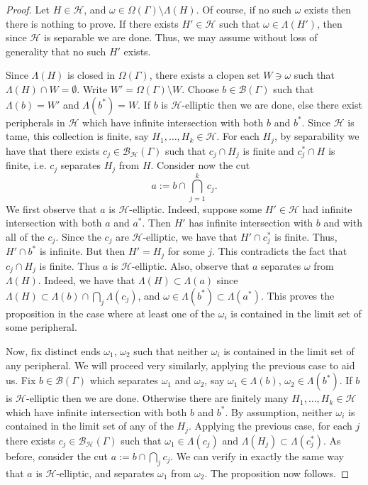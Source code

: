 \documentclass[11pt,a4paper]{amsart}
\theoremstyle{definition}
\newcommand{\per}{\mathcal{H}}
\newcommand{\br}{{\mathscr{B}}}
\begin{document}
\begin{proof}
    Let $H \in \per$, and $\omega \in \Omega(\Gamma) \setminus \Lambda(H)$. Of course, if no such $\omega$ exists then there is nothing to prove. If there exists $H' \in \per$ such that $\omega \in \Lambda(H')$, then since $\per$ is separable we are done. Thus, we may assume without loss of generality that no such $H'$ exists. 

    Since $\Lambda(H)$ is closed in $\Omega(\Gamma)$, there exists a clopen set $W  \ni \omega$ such that $\Lambda(H) \cap W = \emptyset$. Write $W' = \Omega(\Gamma) \setminus W$. Choose $b \in \br(\Gamma)$ such that $\Lambda(b) = W'$ and $\Lambda(b^\ast) = W$. If $b$ is $\per$-elliptic then we are done, else there exist peripherals in $\per$ which have infinite intersection with both $b$ and $b^\ast$. Since $\per$ is tame, this collection is finite, say $H_1, \ldots, H_k \in \per$. For each $H_j$, by separability we have that there exists $c_j \in \br_\per(\Gamma)$ such that $c_j \cap H_j$ is finite and $c_j ^\ast \cap H$ is finite, i.e. $c_j$ separates $H_j$ from $H$. 
    Consider now the cut
    $$
    a := b \cap \bigcap_{j=1}^k c_j. 
    $$
    We first observe that $a$ is $\per$-elliptic. Indeed, suppose some $H'\in \per$ had infinite intersection with both $a$ and $a^\ast$. Then $H'$ has infinite intersection with $b$ and with all of the $c_j$. Since the $c_j$ are $\per$-elliptic, we have that $H' \cap c_j^\ast$ is finite. Thus, $H' \cap b^\ast$ is infinite. But then $H' = H_j$ for some $j$. This contradicts the fact that $c_j \cap H_j$ is finite. Thus $a$ is $\per$-elliptic. Also, observe that $a$ separates $\omega$ from $\Lambda(H)$. Indeed, we have that $\Lambda(H) \subset \Lambda(a)$ since $\Lambda(H) \subset \Lambda(b) \cap \bigcap_j \Lambda(c_j)$, and $\omega \in \Lambda(b^\ast) \subset \Lambda(a^\ast)$. This proves the proposition in the case where at least one of the $\omega_i$ is contained in the limit set of some peripheral. 

    Now, fix distinct ends $\omega_1$, $\omega_2$ such that neither $\omega_i$ is contained in the limit set of any peripheral. We will proceed very similarly, applying the previous case to aid us. 
    Fix $b \in \br(\Gamma)$ which separates $\omega_1$ and $\omega_2$, say $\omega_1 \in \Lambda(b)$, $\omega_2 \in \Lambda(b^\ast)$. If $b$ is $\per$-elliptic then we are done. Otherwise there are finitely many $H_1, \ldots, H_k \in \per$ which have infinite intersection with both $b$ and $b^\ast$. By assumption, neither $\omega_i$ is contained in the limit set of any of the $H_j$. Applying the previous case, for each $j$ there exists $c_j \in \br_\per(\Gamma)$ such that $\omega_1 \in \Lambda(c_j)$ and $\Lambda(H_j) \subset \Lambda(c_j^\ast)$. As before, consider the cut $a := b \cap \bigcap_{j} c_j$. We can verify in exactly the same way that $a$ is $\per$-elliptic, and separates $\omega_1$ from $\omega_2$. The proposition now follows. 
\end{proof}
\end{document}
